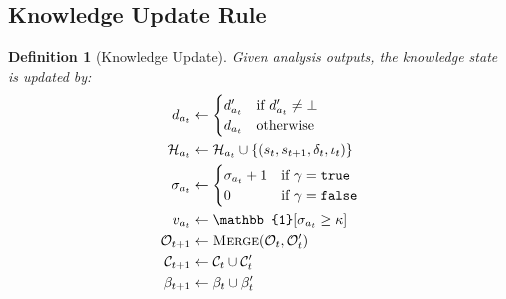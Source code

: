 \documentclass{article}
\newtheorem{definition}{Definition}
\newcommand{\calO}{\mathcal{O}}
\newcommand{\calC}{\mathcal{C}}
\newcommand{\calH}{\mathcal{H}}
\newcommand{\ind}{\mathbb{1}}
\begin{document}
\subsection{Knowledge Update Rule}
\label{sec:update}

\begin{definition}[Knowledge Update]
\label{def:update}
Given analysis outputs, the knowledge state is updated by:
\begin{align}
d_{a_t} &\leftarrow \begin{cases} d'_{a_t} & \text{if } d'_{a_t} \neq \bot \\ d_{a_t} & \text{otherwise} \end{cases} \label{eq:def_update} \\
\calH_{a_t} &\leftarrow \calH_{a_t} \cup \{(s_t, s_{t+1}, \delta_t, \iota_t)\} \label{eq:history_update} \\
\sigma_{a_t} &\leftarrow \begin{cases} \sigma_{a_t} + 1 & \text{if } \gamma = \texttt{true} \\ 0 & \text{if } \gamma = \texttt{false} \end{cases} \label{eq:consistency_update} \\
v_{a_t} &\leftarrow \ind[\sigma_{a_t} \geq \kappa] \label{eq:verify_update} \\
\calO_{t+1} &\leftarrow \textsc{Merge}(\calO_t, \calO'_t) \label{eq:obj_merge} \\
\calC_{t+1} &\leftarrow \calC_t \cup \calC'_t \label{eq:constraint_merge} \\
\beta_{t+1} &\leftarrow \beta_t \cup \beta'_t \label{eq:breakthrough_merge}
\end{align}
\end{definition}
\end{document}
